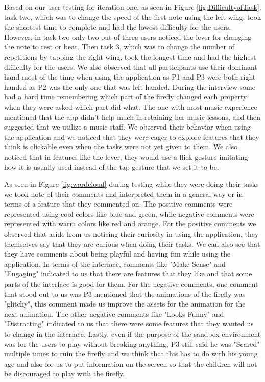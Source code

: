 Based on our user testing for iteration one, as seen in Figure \ref{fig:DifficultyofTask}, task two, which was to change the speed of the first note using the left wing, took the shortest time to complete and had the lowest difficulty for the users. However, in task two only two out of three users noticed the lever for changing the note to rest or beat. Then task 3, which was to change the number of repetitions by tapping the right wing, took the longest time and had the highest difficulty for the users. We also observed that all participants use their dominant hand most of the time when using the application as P1 and P3 were both right handed as P2 was the only one that was left handed. During the interview some had a hard time remembering which part of the firefly changed each property when they were asked which part did what. The one with most music experience mentioned that the app didn't help much in retaining her music lessons, and then suggested that we utilize a music staff. We observed their behavior when using the application and we noticed that they were eager to explore features that they think is clickable even when the tasks were not yet given to them. We also noticed that in features like the lever, they would use a flick gesture imitating how it is usually used instead of the tap gesture that we set it to be. 

 As seen in Figure \ref{fig:wordcloud} during testing while they were doing their tasks we took note of their comments and interpreted them in a general way or in terms of a feature that they commented on. The positive comments were represented using cool colors like blue and green, while negative comments were represented with warm colors like red and orange. For the positive comments we observed that aside from us noticing their curiosity in using the application, they themselves say that they are curious when doing their tasks. We can also see that they have comments about being playful and having fun while using the application. In terms of the interface, comments like "Make Sense" and "Engaging" indicated to us that there are features that they like and that some parts of the interface is good for them. For the negative comments, one comment that stood out to us was P3 mentioned that the animations of the firefly was "glitchy", this comment made us improve the assets for the animation for the next animation. The other negative comments like "Looks Funny" and "Distracting" indicated to us that there were some features that they wanted us to change in the interface. Lastly, even if the purpose of the sandbox environment was for the users to play without breaking anything, P3 still said he was "Scared" multiple times to ruin the firefly and we think that this has to do with his young age and also for us to put information on the screen so that the children will not be discouraged to play with the firefly.
 

